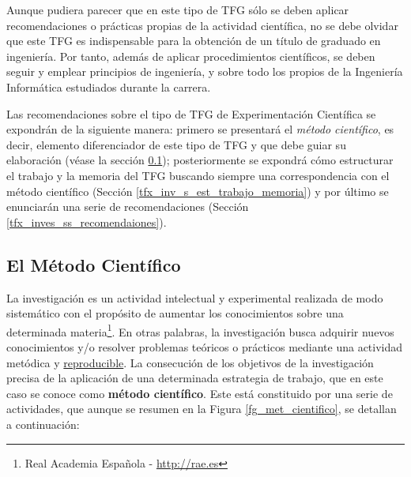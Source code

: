 Aunque pudiera parecer que en este tipo de TFG sólo se deben aplicar recomendaciones o prácticas propias de la actividad científica, no se debe olvidar que este TFG es indispensable para la obtención de un título de graduado en ingeniería. Por tanto, además de aplicar procedimientos científicos, se deben seguir y emplear principios de ingeniería, y sobre todo los propios de la Ingeniería Informática estudiados durante la carrera.

Las recomendaciones sobre el tipo de TFG de Experimentación Científica se expondrán de la siguiente manera: primero se presentará el \textit{método científico}, es decir, elemento diferenciador de este tipo de TFG y que debe guiar su elaboración (véase la sección \ref{tfx_inv_s_met_cientifico}); posteriormente se expondrá cómo estructurar el trabajo y la memoria del TFG buscando siempre una correspondencia con el método científico (Sección  \ref{tfx_inv_s_est_trabajo_memoria}) y por último se enunciarán una serie de recomendaciones (Sección \ref{tfx_inves_ss_recomendaiones}).

\subsection{El Método Científico}\label{tfx_inv_s_met_cientifico}

La investigación es un actividad intelectual y experimental realizada de modo sistemático con el propósito de aumentar los conocimientos sobre una determinada materia\footnote{Real Academia Española - \url{http://rae.es}}. En otras palabras, la investigación busca adquirir nuevos conocimientos y/o resolver problemas teóricos o prácticos mediante una actividad metódica y \underline {reproducible}. La consecución de los objetivos de la investigación precisa de la aplicación de una determinada estrategia de trabajo, que en este caso se conoce como \textbf{método científico}. Este está constituido por una serie de actividades, que aunque se resumen en la Figura \ref{fg_met_cientifico}, se detallan a continuación:

